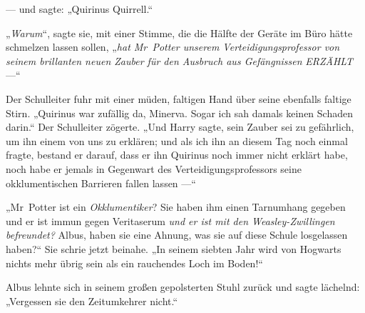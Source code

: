 — und sagte:
„Quirinus Quirrell.“

„\emph{Warum}“, sagte sie, mit einer Stimme, die die Hälfte der Geräte im Büro hätte schmelzen lassen sollen,
„\emph{hat Mr~Potter unserem Verteidigungsprofessor von seinem brillanten neuen Zauber für den Ausbruch aus Gefängnissen} \emph{ERZÄHLT} —“

Der Schulleiter fuhr mit einer müden, faltigen Hand über seine ebenfalls faltige Stirn.
„Quirinus war zufällig da, Minerva. Sogar ich sah damals keinen Schaden darin.“ Der Schulleiter zögerte.
„Und Harry sagte, sein Zauber sei zu gefährlich, um ihn einem von uns zu erklären; und als ich ihn an diesem Tag noch einmal fragte, bestand er darauf, dass er ihn Quirinus noch immer nicht erklärt habe, noch habe er jemals in Gegenwart des Verteidigungsprofessors seine okklumentischen Barrieren fallen lassen —“

„Mr~Potter ist ein \emph{Okklumentiker}? Sie haben ihm einen Tarnumhang gegeben und er ist immun gegen Veritaserum \emph{und er ist mit den Weasley-Zwillingen befreundet?} Albus, haben sie eine Ahnung, was sie auf diese Schule losgelassen haben?“ Sie schrie jetzt beinahe.
„In seinem siebten Jahr wird von Hogwarts nichts mehr übrig sein als ein rauchendes Loch im Boden!“

Albus lehnte sich in seinem großen gepolsterten Stuhl zurück und sagte lächelnd:
„Vergessen sie den Zeitumkehrer nicht.“

